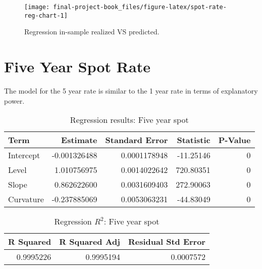 \documentclass[openany]{book}
\theoremstyle{definition}
\theoremstyle{definition}
\theoremstyle{definition}
\theoremstyle{remark}
\begin{document}
\small

\begin{figure}[H]

{\centering \texttt{[image: final-project-book\_files/figure-latex/spot-rate-reg-chart-1]} 

}

\caption{Regression in-sample realized VS predicted.}\label{fig:spot-rate-reg-chart}
\end{figure}

\normalsize

\hypertarget{five-year-spot-rate}{%
\section{Five Year Spot Rate}\label{five-year-spot-rate}}

The model for the 5 year rate is similar to the 1 year rate in terms of
explanatory power.

\small

\begin{table}[H]

\caption{\label{tab:five-year-reg}Regression results: Five year spot}
\centering
\begin{tabular}[t]{lrrrr}
\toprule
Term & Estimate & Standard Error & Statistic & P-Value\\
\midrule
Intercept & -0.001326488 & 0.0001178948 & -11.25146 & 0\\
Level & 1.010756975 & 0.0014022642 & 720.80351 & 0\\
Slope & 0.862622600 & 0.0031609403 & 272.90063 & 0\\
Curvature & -0.237885069 & 0.0053063231 & -44.83049 & 0\\
\bottomrule
\end{tabular}
\end{table}

\normalsize

\small

\begin{table}[H]

\caption{\label{tab:five-year-reg-r2}Regression $R^2$: Five year spot}
\centering
\begin{tabular}[t]{rrr}
\toprule
R Squared & R Squared Adj & Residual Std Error\\
\midrule
0.9995226 & 0.9995194 & 0.0007572\\
\bottomrule
\end{tabular}
\end{table}
\end{document}
